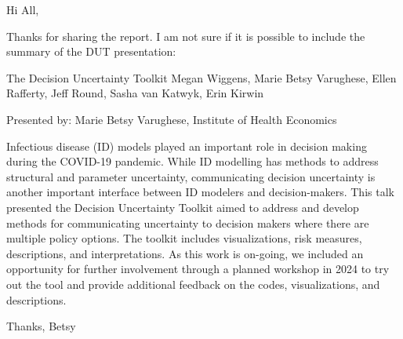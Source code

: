 Hi All,

Thanks for sharing the report. I am not sure if it is possible to include the summary of the DUT presentation:

The Decision Uncertainty Toolkit
Megan Wiggens, Marie Betsy Varughese, Ellen Rafferty, Jeff Round, Sasha van Katwyk, Erin Kirwin

Presented by: Marie Betsy Varughese, Institute of Health Economics

Infectious disease (ID) models played an important role in decision making during the COVID-19 pandemic. While ID modelling has methods to
address structural and parameter uncertainty, communicating decision uncertainty is another important interface between ID modelers and
decision-makers. This talk presented the Decision Uncertainty Toolkit aimed to address and develop methods for communicating uncertainty to
decision makers where there are multiple policy options. The toolkit includes visualizations, risk measures, descriptions, and interpretations.
As this work is on-going, we included an opportunity for further involvement through a planned workshop in 2024 to try out the tool and provide
additional feedback on the codes, visualizations, and descriptions.

Thanks,
Betsy